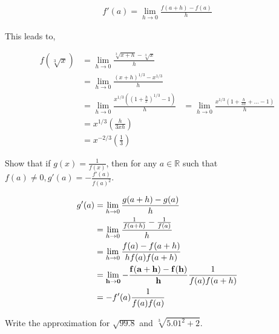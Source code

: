 \documentclass[answers,addpoints]{exam}
\begin{document}
\begin{questions}
\begin{solution}
        \begin{align}
            f'(a)  = \lim_{h \rightarrow 0} \frac{ f(a+h) - f(a) }{h}  
        \end{align}

        This leads to,

        \begin{align}
            f(\sqrt[3]{x}) &= \lim_{h \rightarrow 0} \frac{ \sqrt[3]{x+h} - \sqrt[3]{x} }{h}  \\
                           &= \lim_{h \rightarrow 0} \frac{ (x+h)^{1/3} - x^{1/3} }{h} \\
                           &= \lim_{h \rightarrow 0} \frac{ x^{1/3} \left( 
        \left( 1 + \frac{h}{x}  \right)^{1/3} -1 \right)  }{h}
                           &= \lim_{h \rightarrow 0} \frac{ x^{1/3} \left( 
        1 + \frac{h}{3x} + \ldots  -1 \right)  }{h} \\
                            &= x^{1/3} \left( \frac{h}{3xh} \right) \\
                            &= x^{-2/3} \left( \frac{1}{3} \right) 
        \end{align}


    \end{solution}

    \question[5]
    Show that if $g(x) = \frac{1}{f(x)}$, then for any $a \in \mathbb{R}$ such
    that $f(a) \neq 0, g'(a) = -\frac{f'(a)}{f(a)^2}$.

    \begin{solution}

        \begin{align}
            g'(a) &= \lim_{h \rightarrow 0} \frac{g(a+h)-g(a)}{h} \\
                  &= \lim_{h \rightarrow 0} \frac{ \frac{1}{f(a+h)}-\frac{1}{f(a)}}{h} \\
                  &= \lim_{h \rightarrow 0} \frac{ f(a) - f(a+h) }{h f(a)
            f(a+h)}  \\
            &= {\bf \lim_{h \rightarrow 0} - \frac{ f(a+h) - f(h) }{h}} \frac{1}{f(a) f(a+h)}  \\
            &= - f'(a) \frac{1}{f(a)f(a)}
        \end{align}
        
    \end{solution}

    \question[5]
    Write the approximation for $\sqrt{99.8}$ and $\sqrt[3]{5.01^2 + 2}$.

    \begin{solution}
        

\end{solution}
\end{questions}
\end{document}
